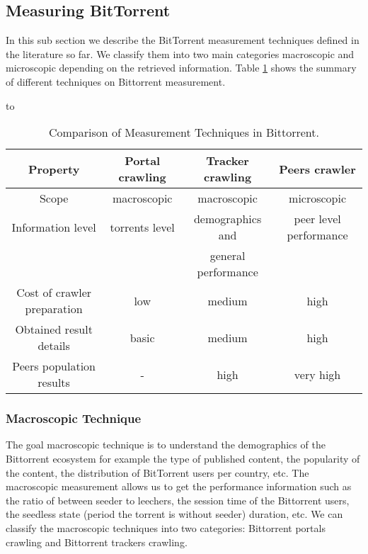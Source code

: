 \subsection{Measuring BitTorrent}
In this sub section we describe the BitTorrent measurement techniques defined in the literature so far. 
We classify them into two main categories macroscopic and microscopic depending on the retrieved information. 
Table \ref{tab:measurementtechniques} shows the summary of different techniques on Bittorrent measurement. 

\begin{table}[thb]
\caption{Comparison of Measurement Techniques in Bittorrent.}
\label{tab:measurementtechniques}
\hbox to\hsize{\hfil}
\begin{tabular}{c|c|c|c}\hline\hline
Property & Portal crawling & Tracker crawling & Peers crawler \\ \hline
Scope & macroscopic & macroscopic & microscopic \\ \hline
Information level & torrents level & demographics and  & peer level performance \\ 
 &  & general performance  & \\ \hline
Cost of crawler preparation & low & medium & high \\ \hline
Obtained result details & basic & medium & high \\ \hline
Peers population results & - & high & very high \\ \hline
\end{tabular}
\end{table}

\subsubsection{Macroscopic Technique}
The goal macroscopic technique is to understand the demographics of the Bittorrent ecosystem for example the type of published content, the popularity of the content, the distribution of BitTorrent users per country, etc. 
The macroscopic measurement allows us to get the performance information such as the ratio of between seeder to leechers, the session time of the Bittorrent users, the seedless state (period the torrent is without seeder) duration, etc.
We can classify the macroscopic techniques into two categories: Bittorrent portals crawling and Bittorrent trackers crawling.


